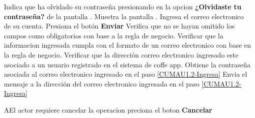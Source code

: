 	\begin{UCtrayectoria}
		\UCpaso[\UCactor] Indica que ha olvidado su contraseña presionando en la opcion \textbf{¿Olvidaste tu contraseña?} de la pantalla .
		\UCpaso Muestra la pantalla .
		\UCpaso [\UCactor]Ingresa el correo electronico de su cuenta. \label{CUMAU1.2-Ingresa}
		\UCpaso [\UCactor]Presiona el botón \textbf{Enviar} 
		\UCpaso Verifica que no se hayan omitido los campos como obligatorios con base a la regla de negocio.  
		\UCpaso Verificar que la informacion ingresada cumpla con el formato de un correo electronico con base en la regla de negocio.  
		\UCpaso Verificar que la dirección correo electronico ingresado este asociado a un usuario registrado en el sistema de coffe app.
		\UCpaso Obtiene la contraseña asociada al correo electronico ingresado en el paso \ref{CUMAU1.2-Ingresa}
		\UCpaso Envia el mensaje \getElementById[MSG]{} a la dirección del correo electronico ingresada en el paso \ref{CUMAU1.2-Ingresa}
	\end{UCtrayectoria}
	
	\begin{UCtrayectoriaA}{A}{El actor requiere cancelar la operacion}
		\UCpaso [\UCactor] preciona el boton \textbf{Cancelar}
	\end{UCtrayectoriaA}
	